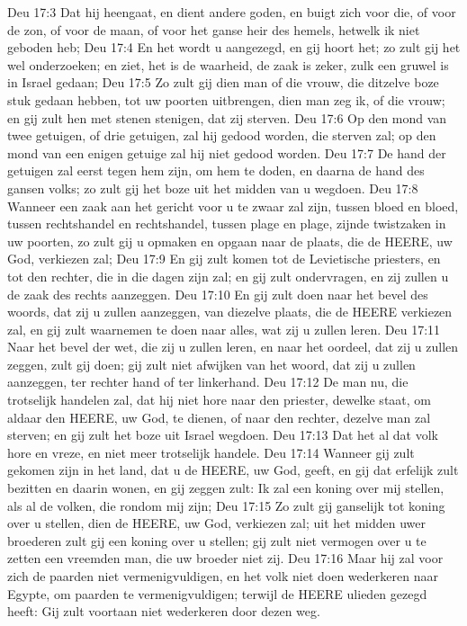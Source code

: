 Deu 17:3  Dat hij heengaat, en dient andere goden, en buigt zich voor die, of voor de zon, of voor de maan, of voor het ganse heir des hemels, hetwelk ik niet geboden heb;
Deu 17:4  En het wordt u aangezegd, en gij hoort het; zo zult gij het wel onderzoeken; en ziet, het is de waarheid, de zaak is zeker, zulk een gruwel is in Israel gedaan;
Deu 17:5  Zo zult gij dien man of die vrouw, die ditzelve boze stuk gedaan hebben, tot uw poorten uitbrengen, dien man zeg ik, of die vrouw; en gij zult hen met stenen stenigen, dat zij sterven.
Deu 17:6  Op den mond van twee getuigen, of drie getuigen, zal hij gedood worden, die sterven zal; op den mond van een enigen getuige zal hij niet gedood worden.
Deu 17:7  De hand der getuigen zal eerst tegen hem zijn, om hem te doden, en daarna de hand des gansen volks; zo zult gij het boze uit het midden van u wegdoen.
Deu 17:8  Wanneer een zaak aan het gericht voor u te zwaar zal zijn, tussen bloed en bloed, tussen rechtshandel en rechtshandel, tussen plage en plage, zijnde twistzaken in uw poorten, zo zult gij u opmaken en opgaan naar de plaats, die de HEERE, uw God, verkiezen zal;
Deu 17:9  En gij zult komen tot de Levietische priesters, en tot den rechter, die in die dagen zijn zal; en gij zult ondervragen, en zij zullen u de zaak des rechts aanzeggen.
Deu 17:10  En gij zult doen naar het bevel des woords, dat zij u zullen aanzeggen, van diezelve plaats, die de HEERE verkiezen zal, en gij zult waarnemen te doen naar alles, wat zij u zullen leren.
Deu 17:11  Naar het bevel der wet, die zij u zullen leren, en naar het oordeel, dat zij u zullen zeggen, zult gij doen; gij zult niet afwijken van het woord, dat zij u zullen aanzeggen, ter rechter hand of ter linkerhand.
Deu 17:12  De man nu, die trotselijk handelen zal, dat hij niet hore naar den priester, dewelke staat, om aldaar den HEERE, uw God, te dienen, of naar den rechter, dezelve man zal sterven; en gij zult het boze uit Israel wegdoen.
Deu 17:13  Dat het al dat volk hore en vreze, en niet meer trotselijk handele.
Deu 17:14  Wanneer gij zult gekomen zijn in het land, dat u de HEERE, uw God, geeft, en gij dat erfelijk zult bezitten en daarin wonen, en gij zeggen zult: Ik zal een koning over mij stellen, als al de volken, die rondom mij zijn;
Deu 17:15  Zo zult gij ganselijk tot koning over u stellen, dien de HEERE, uw God, verkiezen zal; uit het midden uwer broederen zult gij een koning over u stellen; gij zult niet vermogen over u te zetten een vreemden man, die uw broeder niet zij.
Deu 17:16  Maar hij zal voor zich de paarden niet vermenigvuldigen, en het volk niet doen wederkeren naar Egypte, om paarden te vermenigvuldigen; terwijl de HEERE ulieden gezegd heeft: Gij zult voortaan niet wederkeren door dezen weg.
